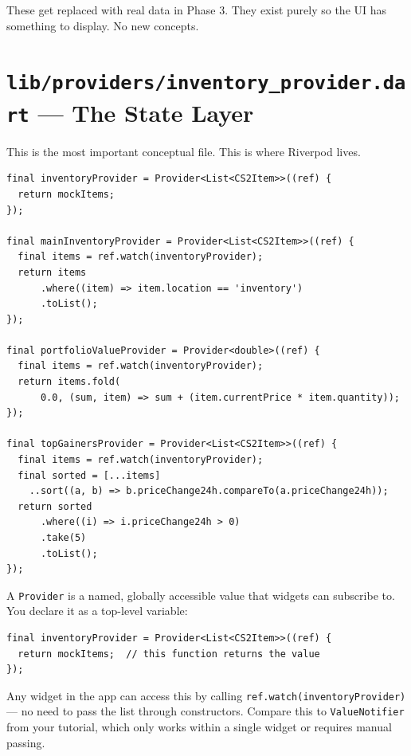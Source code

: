 \documentclass[11pt, a4paper]{article}
\begin{document}
These get replaced with real data in Phase 3. They exist purely so the UI has something to display. No new concepts.

\newpage

\section{\texttt{lib/providers/inventory\_provider.dart} --- The State Layer}

This is the most important conceptual file. This is where Riverpod lives.

\begin{lstlisting}
final inventoryProvider = Provider<List<CS2Item>>((ref) {
  return mockItems;
});

final mainInventoryProvider = Provider<List<CS2Item>>((ref) {
  final items = ref.watch(inventoryProvider);
  return items
      .where((item) => item.location == 'inventory')
      .toList();
});

final portfolioValueProvider = Provider<double>((ref) {
  final items = ref.watch(inventoryProvider);
  return items.fold(
      0.0, (sum, item) => sum + (item.currentPrice * item.quantity));
});

final topGainersProvider = Provider<List<CS2Item>>((ref) {
  final items = ref.watch(inventoryProvider);
  final sorted = [...items]
    ..sort((a, b) => b.priceChange24h.compareTo(a.priceChange24h));
  return sorted
      .where((i) => i.priceChange24h > 0)
      .take(5)
      .toList();
});
\end{lstlisting}

\begin{conceptbox}[title=\textbf{What is a Provider?}]
A \texttt{Provider} is a named, globally accessible value that widgets can subscribe to. You declare it as a top-level variable:

\begin{lstlisting}[numbers=none]
final inventoryProvider = Provider<List<CS2Item>>((ref) {
  return mockItems;  // this function returns the value
});
\end{lstlisting}

Any widget in the app can access this by calling \texttt{ref.watch(inventoryProvider)} --- no need to pass the list through constructors. Compare this to \texttt{ValueNotifier} from your tutorial, which only works within a single widget or requires manual passing.
\end{conceptbox}
\end{document}
